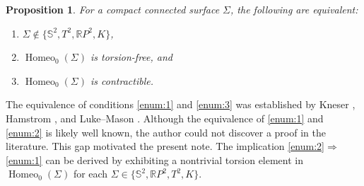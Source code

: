 \documentclass[12pt,a4paper]{amsart}
\numberwithin{equation}{section}
\DeclareMathOperator{\Homeo}{Homeo}
\theoremstyle{plain}
\newtheorem{proposition}[theorem]{Proposition}
\theoremstyle{definition}
\theoremstyle{remark}
\begin{document}
\begin{proposition} \label{prop:torsion_free}
For a compact connected surface $\Sigma$, the following are equivalent:
\begin{enumerate}
    \item \label{enum:1} $\Sigma \notin \{ \mathbb{S}^2, T^2, \mathbb{R}P^2, K \}$,
    \item \label{enum:2} $\Homeo_0(\Sigma)$ is torsion-free, and
    \item \label{enum:3} $\Homeo_0(\Sigma)$ is contractible.
\end{enumerate}
\end{proposition}

The equivalence of conditions \eqref{enum:1} and \eqref{enum:3} was established by Kneser \cite{MR1544816}, Hamstrom \cite{MR170334, MR184234, MR202140}, and Luke--Mason \cite{MR301693}.
Although the equivalence of \eqref{enum:1} and \eqref{enum:2} is likely well known, the author could not discover a proof in the literature.
This gap motivated the present note.
The implication \eqref{enum:2}$\Rightarrow$\eqref{enum:1} can be derived by exhibiting a nontrivial torsion element in $\Homeo_0(\Sigma)$ for each $\Sigma \in \{\mathbb{S}^2, \mathbb{R}P^2, T^2, K\}$.
\end{document}
